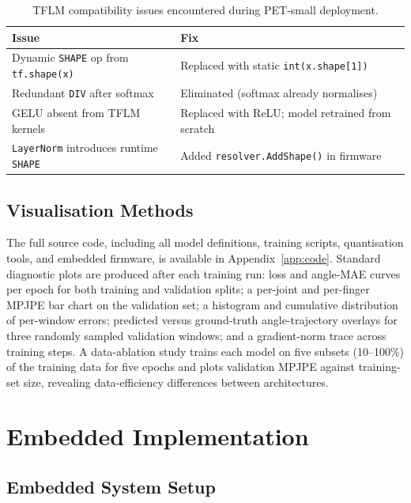 \documentclass[11pt]{article}
\begin{document}
\begin{table}[H]
\centering
\caption{TFLM compatibility issues encountered during PET-small deployment.}
\label{tab:compat}
\begin{tabular}{p{4cm}p{7.5cm}}
\toprule
\textbf{Issue} & \textbf{Fix} \\
\midrule
Dynamic \texttt{SHAPE} op from \texttt{tf.shape(x)} & Replaced with static \texttt{int(x.shape[1])} \\
Redundant \texttt{DIV} after softmax & Eliminated (softmax already normalises) \\
GELU absent from TFLM kernels & Replaced with ReLU; model retrained from scratch \\
\texttt{LayerNorm} introduces runtime \texttt{SHAPE} & Added \texttt{resolver.AddShape()} in firmware \\
\bottomrule
\end{tabular}
\end{table}

\subsection{Visualisation Methods}

The full source code, including all model definitions, training scripts, quantisation tools, and embedded firmware, is available in Appendix~\ref{app:code}. Standard diagnostic plots are produced after each training run: loss and angle-MAE curves per epoch for both training and validation splits; a per-joint and per-finger MPJPE bar chart on the validation set; a histogram and cumulative distribution of per-window errors; predicted versus ground-truth angle-trajectory overlays for three randomly sampled validation windows; and a gradient-norm trace across training steps. A data-ablation study trains each model on five subsets (10--100\%) of the training data for five epochs and plots validation MPJPE against training-set size, revealing data-efficiency differences between architectures.

\section{Embedded Implementation}
\label{sec:embedded}

\subsection{Embedded System Setup}
\end{document}
